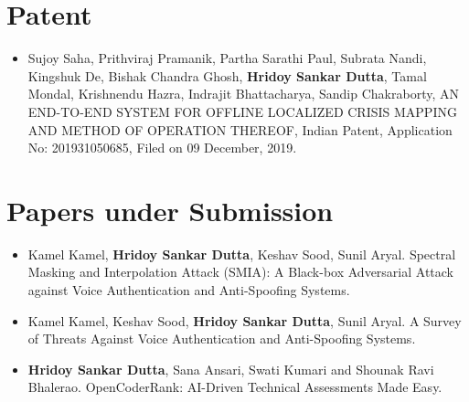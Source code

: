 \documentclass[margin, centered,lmodern]{res}
\begin{document}
\begin{resume}
\section{Patent}
\begin{itemize}[leftmargin=*]

\item Sujoy Saha,  Prithviraj Pramanik,  Partha Sarathi Paul,  Subrata Nandi,  Kingshuk De,  Bishak Chandra Ghosh,  \textbf{Hridoy Sankar Dutta},  Tamal Mondal,  Krishnendu Hazra,  Indrajit Bhattacharya,  Sandip Chakraborty,  AN END-TO-END SYSTEM FOR OFFLINE LOCALIZED CRISIS MAPPING AND METHOD OF OPERATION THEREOF,  Indian Patent,  Application No: 201931050685,  Filed on 09 December, 2019.

\end{itemize}

\section{Papers under Submission}
\begin{itemize}[leftmargin=*]
\item  Kamel Kamel,  \textbf{Hridoy Sankar Dutta}, Keshav Sood, Sunil Aryal. Spectral Masking and Interpolation Attack (SMIA): A Black-box Adversarial Attack against Voice Authentication and Anti-Spoofing Systems.
\item  Kamel Kamel, Keshav Sood,  \textbf{Hridoy Sankar Dutta}, Sunil Aryal. A Survey of Threats Against Voice Authentication and Anti-Spoofing Systems.
\item \textbf{Hridoy Sankar Dutta}, Sana Ansari, Swati Kumari and Shounak Ravi Bhalerao.  OpenCoderRank: AI-Driven Technical Assessments Made Easy. 

\end{itemize}


\end{resume}
\end{document}
